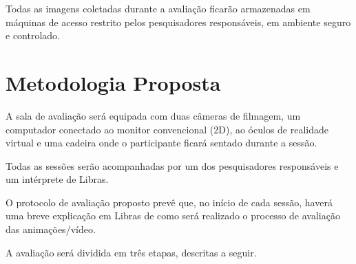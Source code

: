 \documentclass[a4paper,11pt,titlepage,singlespacing]{article}
\begin{document}
Todas as imagens coletadas durante a avaliação ficarão armazenadas em máquinas de acesso restrito pelos pesquisadores responsáveis, em ambiente seguro e controlado.




\section{Metodologia Proposta}


A sala de avaliação será equipada com duas câmeras de filmagem, um computador conectado ao monitor convencional (2D), ao óculos de realidade virtual e uma cadeira onde o participante ficará sentado durante a sessão.

Todas as sessões serão acompanhadas por um dos pesquisadores responsáveis e um intérprete de Libras.

O protocolo de avaliação proposto prevê que, no início de cada sessão, haverá uma breve explicação em Libras de como será realizado o processo de avaliação das animações/vídeo.

A avaliação será dividida em três etapas, descritas a seguir.
\end{document}
